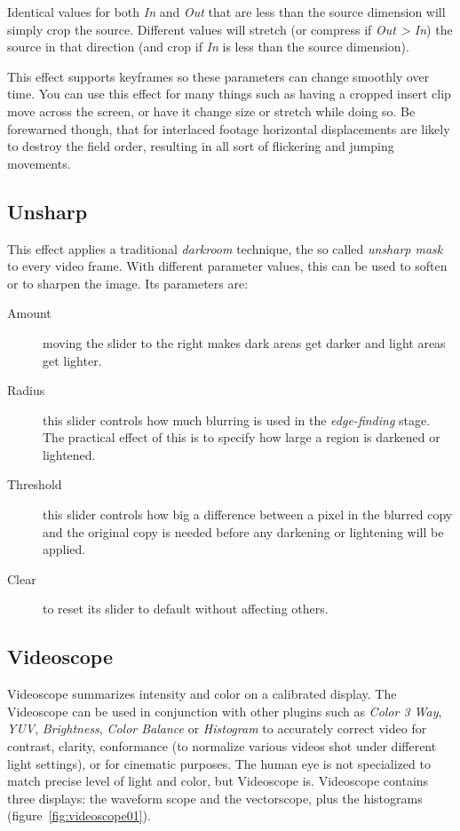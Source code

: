 Identical values for both \textit{In} and \textit{Out} that are less than the source dimension will simply crop the source. Different values will stretch (or compress if \textit{Out > In}) the source in that direction (and crop if \textit{In} is less than the source dimension).

This effect supports keyframes so these parameters can change smoothly over time. You can use this effect for many things such as having a cropped insert clip move across the screen, or have it change size or stretch while doing so. Be forewarned though, that for interlaced footage horizontal displacements are likely to destroy the field order, resulting in all sort of flickering and jumping movements.

\subsection{Unsharp}%
\label{sub:Unsharp}

This effect applies a traditional \textit{darkroom} technique, the so called \textit{unsharp mask} to every video frame. With different parameter values, this can be used to soften or to sharpen the image. Its parameters are:

\begin{description}
    \item[Amount] moving the slider to the right makes dark areas get darker and light areas get lighter.
    \item[Radius] this slider controls how much blurring is used in the \textit{edge-finding} stage. The practical effect of this is to specify how large a region is darkened or lightened.
    \item[Threshold] this slider controls how big a difference between a pixel in the blurred copy and the original copy is needed before any darkening or lightening will be applied.
    \item[Clear] to reset its slider to default without affecting others.
\end{description}

\subsection{Videoscope}%
\label{sub:videoscope}

Videoscope summarizes intensity and color on a calibrated display. The Videoscope can be used in conjunction with other \CGG{} plugins such as \textit{Color 3 Way}, \textit{YUV}, \textit{Brightness}, \textit{Color Balance} or \textit{Histogram} to accurately correct video for contrast, clarity, conformance (to normalize various videos shot under different light settings), or for cinematic purposes. The human eye is not specialized to match precise level of light and color, but Videoscope is. Videoscope contains three displays: the waveform scope and the vectorscope, plus the histograms (figure~\ref{fig:videoscope01}).

